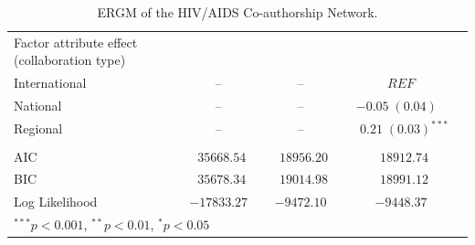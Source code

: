 \begin{table}
\begin{center}
\begin{tabular}{@{}lcclclcl@{}}
Factor attribute effect (collaboration type) &  &    &  &  &   &   \\
\hspace{10pt}International   &  & --   &  & --   &  & $REF$\\
\hspace{10pt}National        & &  --   &  &  -- & & $-0.05 \; (0.04)^{~~~~}$       \\
\hspace{10pt}Regional        & &  --   &  & --  & & $\hspace{6pt}0.21 \; (0.03)^{***}$  \\ \\
\midrule
AIC     & & $\hspace{6pt}35668.54$ &  & $\hspace{6pt}18956.20$   & & $\hspace{6pt}18912.74$   \\
BIC     & & $\hspace{6pt}35678.34$ &  & $\hspace{6pt}19014.98$   & & $\hspace{6pt}18991.12$  \\
Log Likelihood               & & $-17833.27$ & & $-9472.10$   & & $-9448.37$   \\
\bottomrule
\multicolumn{4}{l}{\scriptsize{$^{***}p<0.001$, $^{**}p<0.01$, $^*p<0.05$}}
\end{tabular}
\caption{ERGM of the HIV/AIDS Co-authorship Network.}
\label{tab:hiv_ergm}
\end{center}
\end{table}

